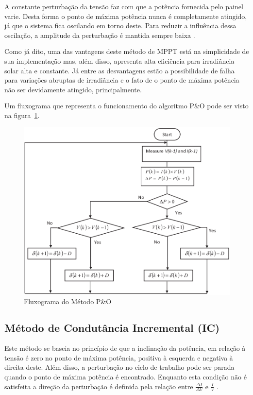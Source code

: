 \documentclass[
	12pt,				%
	openany,
	onseside,
	a4paper,			%
	english,			%
	french,				%
	spanish,			%
	brazil,				%
	]{abntex2}
\begin{document}
A constante perturbação da tensão faz com que a potência fornecida pelo painel varie. Desta forma o ponto de máxima potência nunca é completamente atingido, já que o sistema fica oscilando em torno deste. Para reduzir a influência dessa oscilação, a amplitude da perturbação é mantida sempre baixa \cite{MPPT_P&O_IC}.

Como já dito, uma das vantagens deste método de MPPT está na simplicidade de sua implementação mas, além disso, apresenta alta eficiência para irradiância solar alta e constante. Já entre as desvantagens estão a possibilidade de falha para variações abruptas de irradiância e o fato de o ponto de máxima potência não ser devidamente atingido, principalmente\cite{MPPT_P&O_IC}.

Um fluxograma que representa o funcionamento do algoritmo P\&O pode ser visto na figura~\ref{fig:PeO_Flux}.

\begin{figure}[htbp]
	\begin{center}
		\includegraphics[width=0.65 \linewidth]{peo_flow}
		\caption{Fluxograma do Método P\&O \cite{Talha_MPPT}}
		\label{fig:PeO_Flux}
	\end{center}
\end{figure}

\subsection{Método de Condutância Incremental (IC)}

Este método se baseia no princípio de que a inclinação da potência, em relação à tensão é zero no ponto de máxima potência, positiva à esquerda e negativa à direita deste. Além disso, a perturbação no ciclo de trabalho pode ser parada quando o ponto de máxima potência é encontrado. Enquanto esta condição não é satisfeita a direção da perturbação é definida pela relação entre $\frac{\Delta I}{\Delta V}$ e $\frac{I}{V}$ \cite{Talha_MPPT}\cite{MPPT_P&O_IC}.
\end{document}

